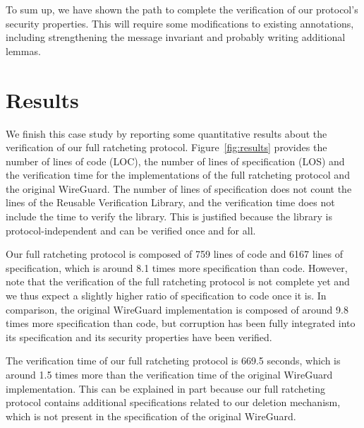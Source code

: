 To sum up, we have shown the path to complete the verification of our protocol's security properties.
This will require some modifications to existing annotations, including strengthening the message invariant and probably writing additional lemmas. 

\section{Results}
\label{sec:results}

We finish this case study by reporting some quantitative results about the verification of our full ratcheting protocol.
Figure~\ref{fig:results} provides the number of lines of code (LOC), the number of lines of specification (LOS) and the verification time for the implementations of the full ratcheting protocol and the original WireGuard.
The number of lines of specification does not count the lines of the Reusable Verification Library, and the verification time does not include the time to verify the library.
This is justified because the library is protocol-independent and can be verified once and for all.

Our full ratcheting protocol is composed of 759 lines of code and 6167 lines of specification, which is around 8.1 times more specification than code.
However, note that the verification of the full ratcheting protocol is not complete yet and we thus expect a slightly higher ratio of specification to code once it is.
In comparison, the original WireGuard implementation is composed of around 9.8 times more specification than code, but corruption has been fully integrated into its specification and its security properties have been verified.

The verification time of our full ratcheting protocol is 669.5 seconds, which is around 1.5 times more than the verification time of the original WireGuard implementation.
This can be explained in part because our full ratcheting protocol contains additional specifications related to our deletion mechanism, which is not present in the specification of the original WireGuard.


